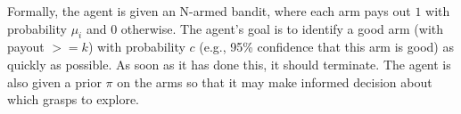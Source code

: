 \documentclass[conference,onecolumn]{IEEEtran}
\begin{document}
Formally, the agent is given an N-armed bandit, where each arm pays
out $1$ with probability $\mu_i$ and $0$ otherwise.  The agent's goal
is to identify a good arm (with payout $>= k$) with probability $c$
(e.g., 95\% confidence that this arm is good) as quickly as possible.
As soon as it has done this, it should terminate.  The agent is also
given a prior $\pi$ on the arms so that it may make informed decision
about which grasps to explore.





\end{document}
